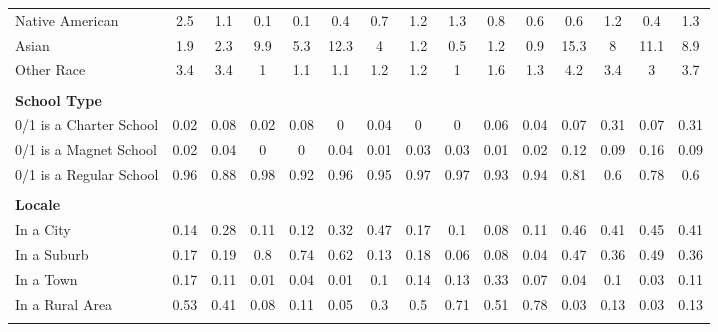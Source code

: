 \begin{tabular*}{\linewidth}{@{\extracolsep{\fill} } lcccccccccccccc}
\hspace{0.2cm}Native American&2.5&1.1&0.1&0.1&0.4&0.7&1.2&1.3&0.8&0.6&0.6&1.2&0.4&1.3\\%
\hspace{0.2cm}Asian&1.9&2.3&9.9&5.3&12.3&4&1.2&0.5&1.2&0.9&15.3&8&11.1&8.9\\%
\hspace{0.2cm}Other Race&3.4&3.4&1&1.1&1.1&1.2&1.2&1&1.6&1.3&4.2&3.4&3&3.7\\%
&&&&&&&&&&&&&&\\%
\multicolumn{15}{l}{\bfseries School Type}\\%
\hspace{0.2cm}0/1 is a Charter School&0.02&0.08&0.02&0.08&0&0.04&0&0&0.06&0.04&0.07&0.31&0.07&0.31\\%
\hspace{0.2cm}0/1 is a Magnet School&0.02&0.04&0&0&0.04&0.01&0.03&0.03&0.01&0.02&0.12&0.09&0.16&0.09\\%
\hspace{0.2cm}0/1 is a Regular School&0.96&0.88&0.98&0.92&0.96&0.95&0.97&0.97&0.93&0.94&0.81&0.6&0.78&0.6\\%
&&&&&&&&&&&&&&\\%
\multicolumn{15}{l}{\bfseries Locale}\\%
\hspace{0.2cm}In a City&0.14&0.28&0.11&0.12&0.32&0.47&0.17&0.1&0.08&0.11&0.46&0.41&0.45&0.41\\%
\hspace{0.2cm}In a Suburb&0.17&0.19&0.8&0.74&0.62&0.13&0.18&0.06&0.08&0.04&0.47&0.36&0.49&0.36\\%
\hspace{0.2cm}In a Town&0.17&0.11&0.01&0.04&0.01&0.1&0.14&0.13&0.33&0.07&0.04&0.1&0.03&0.11\\%
\hspace{0.2cm}In a Rural Area&0.53&0.41&0.08&0.11&0.05&0.3&0.5&0.71&0.51&0.78&0.03&0.13&0.03&0.13\\%
&&&&&&&&&&&&&&\\%
\hline%
\end{tabular*}